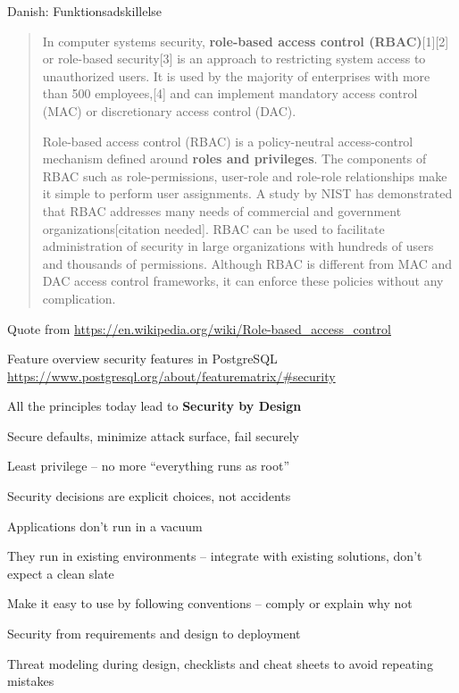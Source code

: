 \documentclass[Screen16to9,17pt]{foils}
\begin{document}
Danish: Funktionsadskillelse



\begin{quote}
In computer systems security, {\bf role-based access control (RBAC)}[1][2] or role-based security[3] is an approach to restricting system access to unauthorized users. It is used by the majority of enterprises with more than 500 employees,[4] and can implement mandatory access control (MAC) or discretionary access control (DAC).

Role-based access control (RBAC) is a policy-neutral access-control mechanism defined around {\bf roles and privileges}. The components of RBAC such as role-permissions, user-role and role-role relationships make it simple to perform user assignments. A study by NIST has demonstrated that RBAC addresses many needs of commercial and government organizations[citation needed]. RBAC can be used to facilitate administration of security in large organizations with hundreds of users and thousands of permissions. Although RBAC is different from MAC and DAC access control frameworks, it can enforce these policies without any complication.
\end{quote}
Quote from \url{https://en.wikipedia.org/wiki/Role-based_access_control}




Feature overview security features in PostgreSQL\\
\url{https://www.postgresql.org/about/featurematrix/#security}



\begin{list1}
\item All the principles today lead to {\bfseries Security by Design}
\begin{list2}
\item Secure defaults, minimize attack surface, fail securely
\item Least privilege -- no more ``everything runs as root''
\item Security decisions are explicit choices, not accidents
\end{list2}
\item Applications don't run in a vacuum
\begin{list2}
\item They run in existing environments -- integrate with existing solutions, don't expect a clean slate
\item Make it easy to use by following conventions -- comply or explain why not
\end{list2}
\item Security from requirements and design to deployment
\begin{list2}
\item Threat modeling during design, checklists and cheat sheets to avoid repeating mistakes
\end{list2}
\end{list1}
\end{document}
